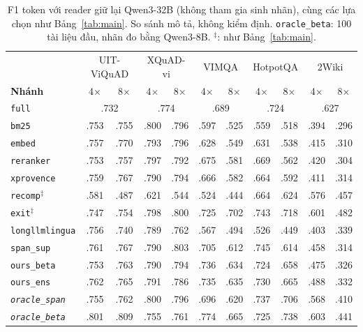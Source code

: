 \documentclass[11pt]{article}
\newcommand{\arm}[1]{\texttt{#1}}
\begin{document}
\begin{table}[t]
\centering
\small
\begin{tabular}{l cc cc cc cc cc}
\toprule
& \multicolumn{2}{c}{UIT-ViQuAD} & \multicolumn{2}{c}{XQuAD-vi} & \multicolumn{2}{c}{VIMQA} & \multicolumn{2}{c}{HotpotQA} & \multicolumn{2}{c}{2Wiki} \\
\cmidrule(lr){2-3}\cmidrule(lr){4-5}\cmidrule(lr){6-7}\cmidrule(lr){8-9}\cmidrule(lr){10-11}
\textbf{Nhánh} & 4$\times$ & 8$\times$ & 4$\times$ & 8$\times$ & 4$\times$ & 8$\times$ & 4$\times$ & 8$\times$ & 4$\times$ & 8$\times$ \\
\midrule
\arm{full} & \multicolumn{2}{c}{.732} & \multicolumn{2}{c}{.774} & \multicolumn{2}{c}{.689} & \multicolumn{2}{c}{.724} & \multicolumn{2}{c}{.627} \\
\midrule
\arm{bm25} & .753 & .755 & .800 & .796 & .597 & .525 & .559 & .518 & .394 & .296 \\
\arm{embed} & .757 & .770 & .793 & .796 & .628 & .549 & .631 & .538 & .415 & .310 \\
\arm{reranker} & .753 & .757 & .797 & .792 & .675 & .581 & .669 & .562 & .420 & .304 \\
\arm{xprovence} & .759 & .767 & .790 & .794 & .666 & .582 & .664 & .592 & .411 & .314 \\
\arm{recomp}$^\ddagger$ & .581 & .487 & .621 & .544 & .524 & .444 & .664 & .624 & .576 & .457 \\
\arm{exit}$^\ddagger$ & .747 & .754 & .798 & .800 & .725 & .702 & .743 & .718 & .601 & .482 \\
\arm{longllmlingua} & .756 & .740 & .789 & .762 & .567 & .494 & .526 & .449 & .403 & .339 \\
\midrule
\arm{span\_sup} & .761 & .767 & .790 & .803 & .705 & .612 & .745 & .614 & .458 & .314 \\
\arm{ours\_beta} & .753 & .763 & .790 & .794 & .736 & .634 & .724 & .658 & .475 & .326 \\
\arm{ours\_ens} & .762 & .765 & .791 & .786 & .735 & .635 & .730 & .665 & .488 & .332 \\
\midrule
\textit{\arm{oracle\_span}} & .755 & .762 & .800 & .796 & .696 & .620 & .737 & .706 & .568 & .410 \\
\textit{\arm{oracle\_beta}} & .801 & .809 & .755 & .761 & .774 & .665 & .725 & .738 & .603 & .441 \\
\bottomrule
\end{tabular}
\caption{F1 token với reader giữ lại Qwen3-32B (không tham gia sinh nhãn), cùng các lựa chọn như
Bảng~\ref{tab:main}. So sánh mô tả, không kiểm định. \arm{oracle\_beta}: 100 tài liệu đầu, nhãn đo bằng
Qwen3-8B. $^\ddagger$: như Bảng~\ref{tab:main}.}
\label{tab:heldout}
\end{table}
\end{document}
